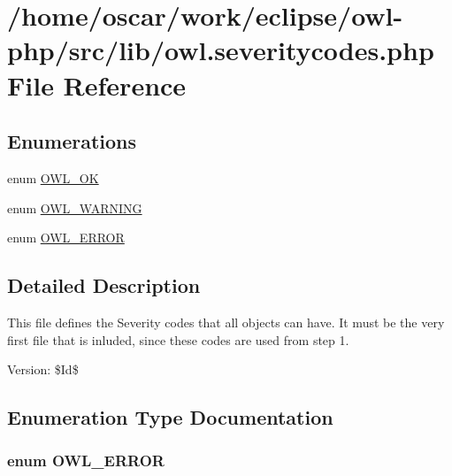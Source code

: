 \hypertarget{owl_8severitycodes_8php}{
\section{/home/oscar/work/eclipse/owl-php/src/lib/owl.severitycodes.php File Reference}
\label{owl_8severitycodes_8php}
}
\subsection*{Enumerations}
\begin{Indent}{\bf }\par
\begin{CompactItemize}
\item 
enum \hyperlink{owl_8severitycodes_8php_bc72c053cfd10025fe57797c41eab18e}{OWL\_\-OK} 
\item 
enum \hyperlink{owl_8severitycodes_8php_ce886152e2e86cd2e91cb833fd495adb}{OWL\_\-WARNING} 
\item 
enum \hyperlink{owl_8severitycodes_8php_b57d46c4dff0628f7f46aa11db9325c9}{OWL\_\-ERROR} 
\end{CompactItemize}
\end{Indent}


\subsection{Detailed Description}
This file defines the Severity codes that all objects can have. It must be the very first file that is inluded, since these codes are used from step 1. \begin{Desc}
\item[Version:]\$Id\$ \end{Desc}


\subsection{Enumeration Type Documentation}
\hypertarget{owl_8severitycodes_8php_b57d46c4dff0628f7f46aa11db9325c9}{
\subsubsection{\setlength{\rightskip}{0pt plus 5cm}enum {\bf OWL\_\-ERROR}}}
\label{owl_8severitycodes_8php_b57d46c4dff0628f7f46aa11db9325c9}


